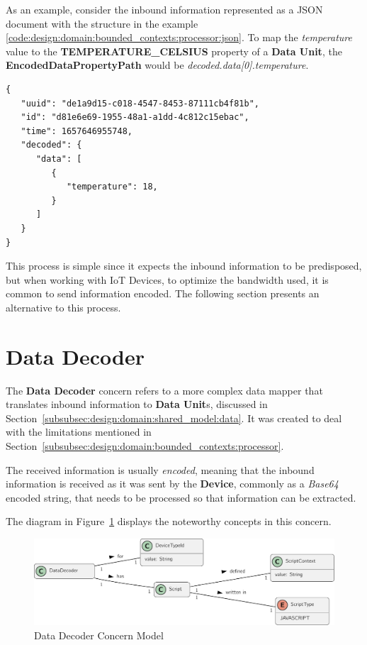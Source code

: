 As an example, consider the inbound information represented as a JSON document with the structure in the example \ref{code:design:domain:bounded_contexts:processor:json}. To map the \textit{temperature} value to the \textbf{TEMPERATURE\_CELSIUS} property of a \textbf{Data Unit}, the \textbf{EncodedDataPropertyPath} would be \textit{decoded.data[0].temperature}.

\begin{lstlisting}[caption=Inbound Information Example, label={code:design:domain:bounded_contexts:processor:json}]
{
   "uuid": "de1a9d15-c018-4547-8453-87111cb4f81b",
   "id": "d81e6e69-1955-48a1-a1dd-4c812c15ebac",
   "time": 1657646955748,
   "decoded": {
      "data": [
         {
            "temperature": 18,
         }
      ]
   }
}
\end{lstlisting}

This process is simple since it expects the inbound information to be predisposed, but when working with \gls{IoT} Devices, to optimize the bandwidth used, it is common to send information encoded. The following section presents an alternative to this process.

\section{Data Decoder}
\label{subsubsec:design:domain:bounded_contexts:decoder}

The \textbf{Data Decoder} concern refers to a more complex data mapper that translates inbound information to \textbf{Data Unit}s, discussed in Section~\ref{subsubsec:design:domain:shared_model:data}.
It was created to deal with the limitations mentioned in Section~\ref{subsubsec:design:domain:bounded_contexts:processor}.

The received information is usually \textit{encoded}, meaning that the inbound information is received as it was sent by the \textbf{Device}, commonly as a \textit{Base64} encoded string, that needs to be processed so that information can be extracted.

The diagram in Figure~\ref{fig:design:domain:bounded_contexts:decoder:diagram} displays the noteworthy concepts in this concern.

\begin{figure}[H]
   \centering
  \includegraphics[page=1,width=\columnwidth]{assets/diagrams/design/domain/data-decoder-model.pdf}
  \caption[Data Decoder Concern Model]{Data Decoder Concern Model}
  \label{fig:design:domain:bounded_contexts:decoder:diagram}
\end{figure}

